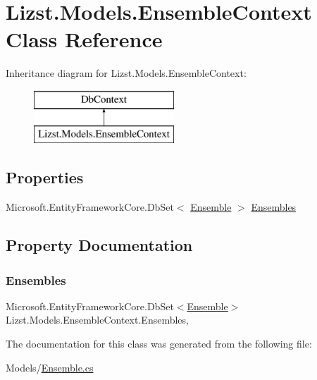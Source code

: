 \hypertarget{class_lizst_1_1_models_1_1_ensemble_context}{}\section{Lizst.\+Models.\+Ensemble\+Context Class Reference}
\label{class_lizst_1_1_models_1_1_ensemble_context}
Inheritance diagram for Lizst.\+Models.\+Ensemble\+Context\+:\begin{figure}[H]
\begin{center}
\leavevmode
\includegraphics[height=2.000000cm]{class_lizst_1_1_models_1_1_ensemble_context}
\end{center}
\end{figure}
\subsection*{Properties}
\begin{DoxyCompactItemize}
\item 
Microsoft.\+Entity\+Framework\+Core.\+Db\+Set$<$ \mbox{\hyperlink{class_lizst_1_1_models_1_1_ensemble}{Ensemble}} $>$ \mbox{\hyperlink{class_lizst_1_1_models_1_1_ensemble_context_aa0ae2dd45fc5cf36d656f4d28898d9f2}{Ensembles}}
\end{DoxyCompactItemize}


\subsection{Property Documentation}
\mbox{\label{class_lizst_1_1_models_1_1_ensemble_context_aa0ae2dd45fc5cf36d656f4d28898d9f2}} 
\subsubsection{\texorpdfstring{Ensembles}{Ensembles}}
{\footnotesize\ttfamily Microsoft.\+Entity\+Framework\+Core.\+Db\+Set$<$\mbox{\hyperlink{class_lizst_1_1_models_1_1_ensemble}{Ensemble}}$>$ Lizst.\+Models.\+Ensemble\+Context.\+Ensembles\hspace{0.3cm}{\ttfamily [get]}, {\ttfamily [set]}}



The documentation for this class was generated from the following file\+:\begin{DoxyCompactItemize}
\item 
Models/\mbox{\hyperlink{_ensemble_8cs}{Ensemble.\+cs}}\end{DoxyCompactItemize}
